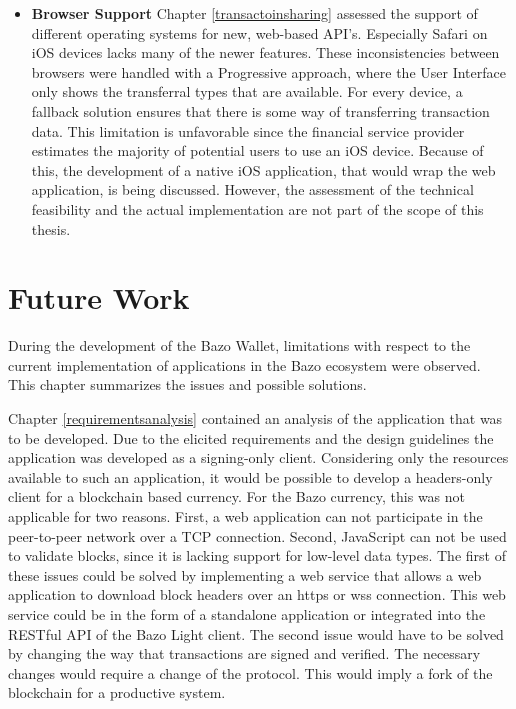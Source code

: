 \begin{itemize}
\item \textbf{Browser Support} 
Chapter \ref{transactoinsharing} assessed the support of different operating systems for new, web-based API's. Especially Safari on iOS devices lacks many of the newer features. These inconsistencies between browsers were handled with a Progressive approach, where the User Interface only shows the transferral types that are available. For every device, a fallback solution ensures that there is some way of transferring transaction data.
This limitation is unfavorable since the financial service provider estimates the majority of potential users to use an iOS device. Because of this, the development of a native iOS application, that would wrap the web application, is being discussed. However, the assessment of the technical feasibility and the actual implementation are not part of the scope of this thesis.

\end{itemize}

\section{Future Work}\label{futurework}
During the development of the Bazo Wallet, limitations with respect to the current implementation of applications in the Bazo ecosystem were observed. This chapter summarizes the issues and possible solutions.

Chapter \ref{requirementsanalysis} contained an analysis of the application that was to be developed. Due to the elicited requirements and the design guidelines the application was developed as a signing-only client. Considering only the resources available to such an application, it would be possible to develop a headers-only client for a blockchain based currency. For the Bazo currency, this was not applicable for two reasons. First, a web application can not participate in the peer-to-peer network over a TCP connection. Second, JavaScript can not be used to validate blocks, since it is lacking support for low-level data types. The first of these issues could be solved by implementing a web service that allows a web application to download block headers over an https or wss connection. This web service could be in the form of a standalone application or integrated into the RESTful API of the Bazo Light client. The second issue would have to be solved by changing the way that transactions are signed and verified. The necessary changes would require a change of the protocol. This would imply a fork of the blockchain for a productive system.

